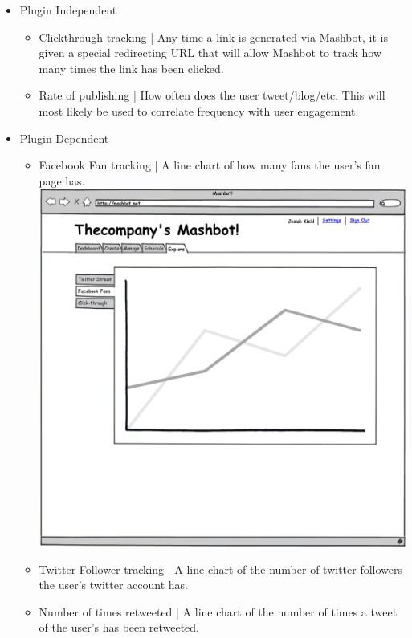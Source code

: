 \documentclass{article}
\begin{document}
\begin{itemize}
\item Plugin Independent
  \begin{itemize}
  \item Clickthrough tracking | Any time a link is generated via Mashbot, it is given a special redirecting URL that will allow Mashbot to track how many times the link has been clicked.
  \item Rate of publishing | How often does the user tweet/blog/etc. This will most likely be used to correlate frequency with user engagement.
  \end{itemize}
\item Plugin Dependent
  \begin{itemize}
  \item Facebook Fan tracking | A line chart of how many fans the user's fan page has.
    \includegraphics[width=\textwidth]{../mockups/explore-facebook.png}
  \item Twitter Follower tracking | A line chart of the number of twitter followers the user's twitter account has.
  \item Number of times retweeted | A line chart of the number of times a tweet of the user's has been retweeted.
  \end{itemize}
\end{itemize}
\end{document}
